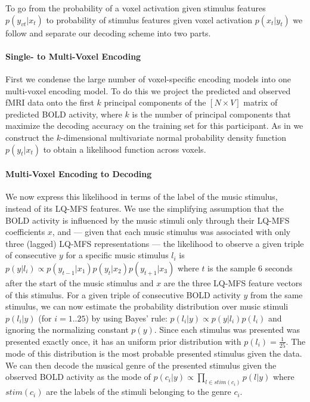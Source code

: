 To go from the probability of a voxel activation
given stimulus features $p(y_{vt}|x_{t})$ to probability of stimulus features
given voxel activation $p(x_{t}|y_{t})$ we follow \citet{NG09} and separate our
decoding scheme into two parts. 

\paragraph{Single- to Multi-Voxel Encoding}

First we condense the large number of voxel-specific encoding models into one
multi-voxel encoding model.  To do this we project the predicted and observed
f{MRI} data onto the first $k$ principal components of the $[N\times V]$ matrix
of predicted BOLD activity, where $k$ is the number of principal components
that maximize the decoding accuracy on the training set for this participant.
As in \citet{NG09} we construct the $k$-dimensional multivariate normal
probability density function $p(y_{t}|x_{t})$ to obtain a likelihood function
across voxels. 

\paragraph{Multi-Voxel Encoding to Decoding}

We now express this likelihood in terms of the label of the music stimulus, instead of its LQ-MFS features.  We
use the simplifying assumption that the BOLD activity is influenced by the
music stimuli only through their LQ-MFS coefficients $x$, and --- given that
each music stimulus was associated with only three (lagged) LQ-MFS
representations --- the likelihood to observe a given triple of consecutive $y$
for a specific music stimulus $l_{i}$ is $p(y|l_{i}) \propto
p(y_{t-1}|x_{1})p(y_{t}|x_{2})p(y_{t+1}|x_{3})$ where $t$ is the sample 6
seconds after the start of the music stimulus and $x$ are the three LQ-MFS
feature vectors of this stimulus.  For a given triple of consecutive BOLD
activity $y$ from the same stimulus, we can now estimate the probability
distribution over music stimuli $p(l_{i}|y)$ (for $i=1..25$) by using Bayes'
rule: $p(l_{i}|y) \propto p(y|l_{i})p(l_{i})$ and ignoring the normalizing
constant $p(y)$. Since each stimulus was presented was presented exactly once,
it has an uniform prior distribution with $p(l_{i})=\frac{1}{25}$. The mode of
this distribution is the most probable presented stimulus given the data.  We
can then decode the musical genre of the presented stimulus given the observed
BOLD activity as the mode of $p(c_{i}|y) \propto \prod\nolimits_{l \in
  stim(c_{i})} p(l|y)$ where $stim(c_{i})$ are the labels of the stimuli
  belonging to the genre $c_{i}$. 

